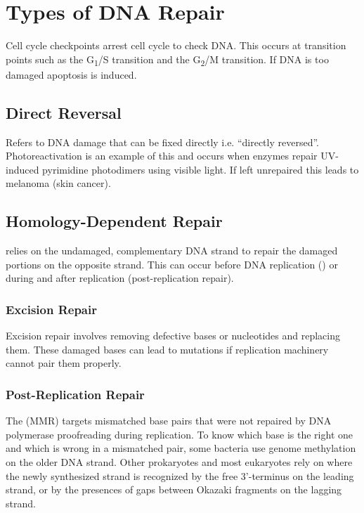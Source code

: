 \documentclass[../Bio_chemistryReview.tex]{subfiles}
\begin{document}
\section{Types of DNA Repair}
Cell cycle checkpoints arrest cell cycle to check DNA. This occurs at
transition points such as the G\textsubscript{1}/S transition and the
G\textsubscript{2}/M transition. If DNA is too damaged apoptosis is induced.

\subsection{Direct Reversal}
Refers to DNA damage that can be fixed directly i.e. ``directly reversed''.
Photoreactivation is an example of this and occurs when enzymes repair
UV-induced pyrimidine photodimers using visible light. If left unrepaired this
leads to melanoma (skin cancer).

\subsection{Homology-Dependent Repair}
 relies on the undamaged, complementary DNA
strand to repair the damaged portions on the opposite strand. This can occur
before DNA replication () or during and after
replication (post-replication repair).

\subsubsection{Excision Repair} 
Excision repair involves removing defective bases or nucleotides and replacing
them. These damaged bases can lead to mutations if replication machinery cannot
pair them properly.

\subsubsection{Post-Replication Repair}
The  (MMR) targets mismatched base pairs that
were not repaired by DNA polymerase proofreading during replication. To know
which base is the right one and which is wrong in a mismatched pair, some
bacteria use genome methylation on the older DNA strand. Other prokaryotes and
most eukaryotes rely on where the newly synthesized strand is recognized by the
free 3'-terminus on the leading strand, or by the presences of gaps between
Okazaki fragments on the lagging strand.
\end{document}
